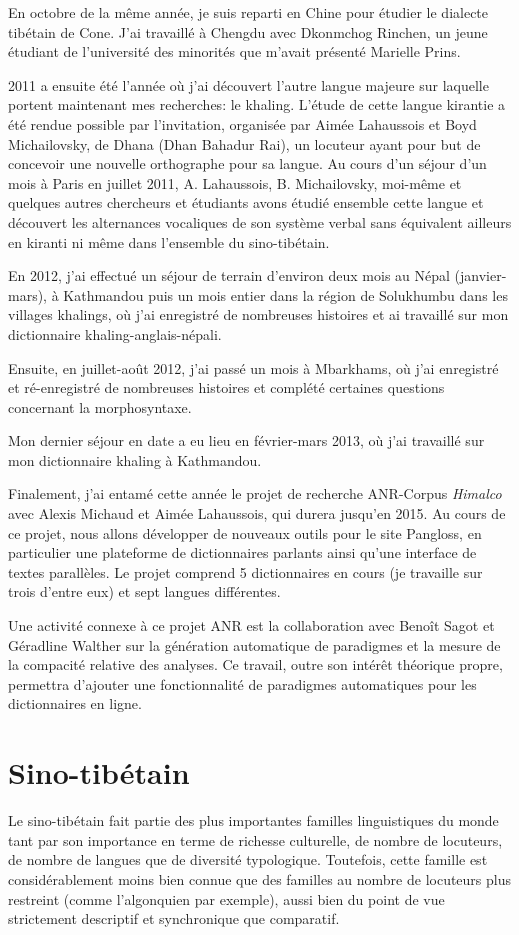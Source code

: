 \documentclass[oldfontcommands,oneside,a4paper,11pt]{memoir}
\begin{document}
En octobre de la même année, je suis reparti en Chine pour étudier le dialecte tibétain de Cone. J'ai travaillé à Chengdu avec Dkonmchog Rinchen, un jeune étudiant de l'université des minorités que m'avait présenté Marielle Prins.

2011 a ensuite été l'année où j'ai découvert l'autre langue majeure sur laquelle portent maintenant mes recherches: le khaling. L'étude de cette langue kirantie a été rendue possible par l'invitation, organisée par Aimée Lahaussois et Boyd Michailovsky, de Dhana (Dhan Bahadur Rai), un locuteur ayant pour but de concevoir une nouvelle orthographe pour sa langue. Au cours d'un séjour d'un mois à Paris en juillet 2011, A. Lahaussois, B. Michailovsky, moi-même et quelques autres chercheurs et étudiants avons étudié ensemble cette langue et découvert les alternances vocaliques de son système verbal sans équivalent ailleurs en kiranti ni même dans l'ensemble du sino-tibétain.


En 2012, j'ai effectué un séjour de terrain d'environ deux mois au Népal (janvier-mars), à Kathmandou puis un mois entier dans la région de Solukhumbu dans les villages khalings, où j'ai enregistré de nombreuses histoires et ai travaillé sur mon dictionnaire khaling-anglais-népali.  

Ensuite, en juillet-août 2012, j'ai passé un mois à Mbarkhams, où j'ai enregistré et ré-enregistré de nombreuses histoires et complété certaines questions concernant la morphosyntaxe.

Mon dernier séjour en date a eu lieu en février-mars 2013, où j'ai travaillé sur mon dictionnaire khaling à Kathmandou. 

Finalement, j'ai entamé cette année le projet de recherche ANR-Corpus \textit{Himalco} avec Alexis Michaud et Aimée Lahaussois, qui durera jusqu'en 2015. Au cours de ce projet, nous allons développer de nouveaux outils pour le site Pangloss, en particulier une plateforme de dictionnaires parlants ainsi qu'une interface de textes parallèles. Le projet comprend 5 dictionnaires en cours (je travaille sur trois d'entre eux) et sept langues différentes.

Une activité connexe à ce projet ANR est la collaboration avec Benoît Sagot et Géradline Walther sur la génération automatique de paradigmes et la mesure de la compacité relative des analyses. Ce travail, outre son intérêt théorique propre, permettra d'ajouter une fonctionnalité de paradigmes automatiques pour les dictionnaires en ligne.
 
\section{Sino-tibétain}
Le  sino-tibétain fait partie des plus importantes familles linguistiques du monde tant par son importance en terme de richesse culturelle, de nombre de locuteurs, de nombre de langues que de diversité typologique. Toutefois, cette famille est considérablement moins bien connue que des familles au nombre de locuteurs plus restreint (comme l'algonquien par exemple), aussi bien du point de vue strictement descriptif et synchronique  que comparatif.
\end{document}
